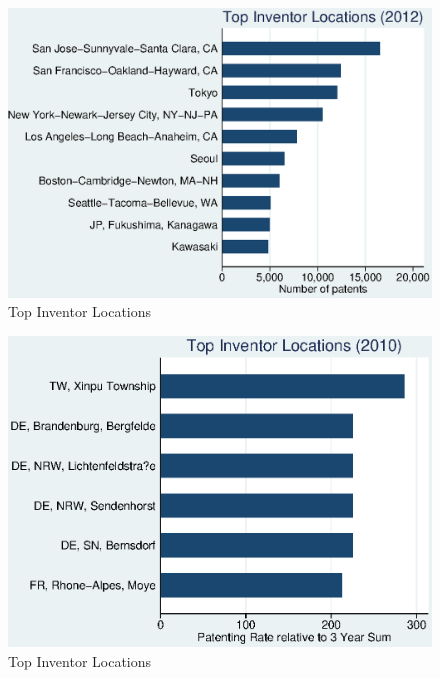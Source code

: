 \documentclass[12pt]{article}
\begin{document}
\begin{figure}[h]
\begin{centering}
  \includegraphics{2012top10}
  \caption{Top Inventor Locations}
  \label{fig:2012top10}
\end{centering}
\end{figure}



\begin{figure}[h]
\begin{centering}
  \includegraphics{r32010top10}
  \caption{Top Inventor Locations}
  \label{fig:r32010top10}
\end{centering}
\end{figure}
\end{document}
